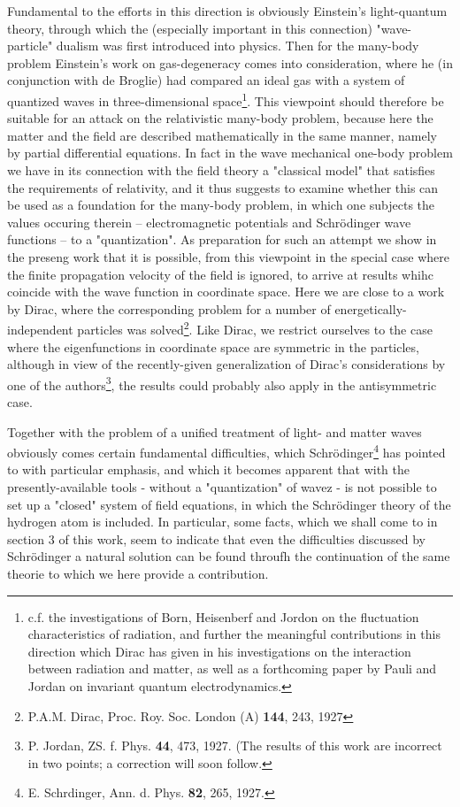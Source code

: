 \documentclass{article}
\begin{document}
Fundamental to the efforts in this direction is obviously Einstein's light-quantum theory, through which the (especially important in this connection) "wave-particle" dualism was first introduced into physics. Then for the many-body problem Einstein's work on gas-degeneracy comes into consideration, where he (in conjunction with de Broglie) had compared an ideal gas with a system of quantized waves in three-dimensional space\footnote{c.f. the investigations of Born, Heisenberf and Jordon on the fluctuation characteristics of radiation, and further the meaningful contributions in this direction which Dirac has given in his investigations on the interaction between radiation and matter, as well as a forthcoming paper by Pauli and Jordan on invariant quantum electrodynamics.}. This viewpoint should therefore be suitable for an attack on the relativistic many-body problem, because here the matter and the field are described mathematically in the same manner, namely by partial differential equations. In fact in the wave mechanical one-body problem we have in its connection with the field theory a "classical model" that satisfies the requirements of relativity, and it thus suggests to examine whether this can be used as a foundation for the many-body problem, in which one subjects the values occuring therein -- electromagnetic potentials and Schrödinger wave functions -- to a "quantization". As preparation for such an attempt we show in the preseng work that it is possible, from this viewpoint in the special case where the finite propagation velocity of the field is ignored, to arrive at results whihc coincide with the wave function in coordinate space. Here we are close to a work by Dirac, where the corresponding problem for a number of energetically-independent particles was solved\footnote{P.A.M. Dirac, Proc. Roy. Soc. London (A) \textbf{144}, 243, 1927}. Like Dirac, we restrict ourselves to the case where the eigenfunctions in coordinate space are symmetric in the particles, although in view of the recently-given generalization of Dirac's considerations by one of the authors\footnote{P. Jordan, ZS. f. Phys. \textbf{44}, 473, 1927. (The results of this work are incorrect in two points; a correction will soon follow.}, the results could probably also apply in the antisymmetric case.

Together with the problem of a unified treatment of light- and matter waves obviously comes certain fundamental difficulties, which Schrödinger\footnote{E. Schrdinger, Ann. d. Phys. \textbf{82}, 265, 1927.} has pointed to with particular emphasis, and which it becomes apparent that with the presently-available tools - without a "quantization" of wavez - is not possible to set up a "closed" system of field equations, in which the Schrödinger theory of the hydrogen atom is included. In particular, some facts, which we shall come to in section 3 of this work, seem to indicate that even the difficulties discussed by Schrödinger a natural solution can be found throufh the continuation of the same theorie to which we here provide a contribution.
\end{document}
